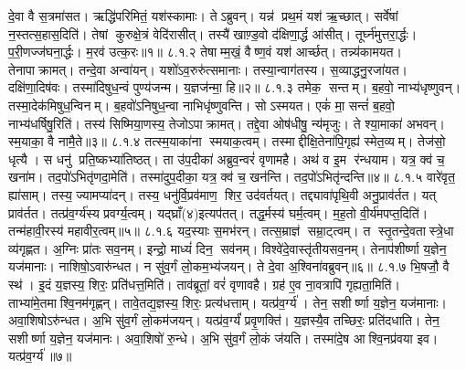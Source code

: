 दे॒वा वै स॒त्रमा॑सत। ऋद्धि॑परिमितं॒ यश॑स्कामाः। तेऽब्रुवन्। यन्न॑ प्रथ॒मं यश॑ ऋ॒च्छात्। सर्वे॑षां न॒स्तत्स॒हास॒दिति॑। तेषां कुरुक्षे॒त्रं वेदि॑रासीत्। तस्यै॑ खाण़्ड॒वो द॑क्षिणा॒र्द्ध आ॑सीत्। तूर्घ्न॑मुत्तरा॒र्द्धः। प॒री॒णज्ज॑घना॒र्द्धः। म॒रव॑ उत्क॒रः॥१॥
८.१.२
तेषाम्म॒खं॒ वैष्ण॒वं यश॑ आर्च्छत्। तन्न्य॑कामयत। तेनापाक्रामत्। तन्दे॒वा अन्वा॑यन्। यशो॑ऽव॒रुरु॑त्समानाः। तस्या॒न्वाग॑तस्य। स॒व्याद्धनु॒रजा॑यत। दक्षि॑णा॒दिष॑वः। तस्मा॑दिषुध॒न्वं पुण्य॑जन्म। य॒ज्ञज॑न्मा॒ हि॥२॥
८.१.३
तमेक॒ सन्तम्। ब॒हवो॒ नाभ्य॑धृष्णुवन्। तस्मा॒देक॑मिषुध॒न्विनम्। ब॒हवो॑ऽनिषुध॒न्वा नाभिधृ॑ष्णुवन्ति। सोऽस्मयत। एकं॑ मा॒ सन्तं॑ ब॒हवो॒ नाभ्य॑धर्\mbox{}षिषु॒रिति॑। तस्य॑ सिष्मिया॒णस्य॒ तेजोऽपाक्रामत्। तद्दे॒वा ओष॑धीषु॒ न्य॑मृजुः। ते श्या॒माका॑ अभवन्। स्म॒याका॒ वै नामै॒ते॥३॥
८.१.४
तत्स्म॒याका॑ना स्मयाक॒त्वम्। तस्माद्दीक्षि॒तेना॑पि॒गृह्य॑ स्मेत॒व्यम्। तेज॑सो॒ धृत्यै। स धनु॑ प्रति॒ष्कभ्या॑तिष्ठत्। ता उ॑प॒दीका॑ अब्रुव॒न्वरं॑ वृणामहै। अथ॑ व इ॒म र॑न्धयाम। यत्र॒ क्व॑ च॒ खना॑म। तद॒पो॑ऽभितृ॑णदा॒मेति॑। तस्मा॑दुप॒दीका॒ यत्र॒ क्व॑ च॒ खन॑न्ति। तद॒पो॑ऽभितृ॑न्दन्ति॥४॥
८.१.५
वारे॑वृत॒ ह्या॑साम्। तस्य॒ ज्यामप्या॑दन्। तस्य॒ धनु॑र्वि॒प्रव॑माण॒ शिर॒ उद॑वर्तयत्। तद्द्यावा॑पृथि॒वी अनु॒प्राव॑र्तत। यत् प्राव॑र्तत। तत्प्र॑व॒र्ग्य॑स्य प्रवर्ग्य॒त्वम्। यद्घ्राँ(४)इत्यप॑तत्। तद्ध॒र्मस्य॑ घर्म॒त्वम्। म॒ह॒तो वी॒र्य॑मपप्त॒दिति॑। तन्म॑हावी॒रस्य॑ महावीर॒त्वम्॥५॥
८.१.६
यद॒स्याः स॒मभ॑रन्। तत्स॒म्राज्ञ॑ सम्रा॒ट्त्वम्। त स्तृ॒तन्दे॒वतास्त्रे॒धा व्य॑गृह्णत। अ॒ग्निः प्रा॑तः सव॒नम्। इन्द्रो॒ माध्यं॑ दिन॒ सव॑नम्। विश्वे॑दे॒वास्तृ॑तीयसव॒नम्। तेनाप॑शीर्ष्णा य॒ज्ञेन॒ यज॑मानाः। नाशिषो॒ऽवारु॑न्धत। न सु॑व॒र्गं लो॒कम॒भ्य॑जयन्। ते दे॒वा अ॒श्विना॑वब्रुवन्॥६॥
८.१.७
भि॒षजौ॒ वै स्थ॑। इ॒दं य॒ज्ञस्य॒ शिरः॒ प्रति॑धत्त॒मिति॑। ताव॑ब्रूतां॒ वरं॑ वृणावहै। ग्रह॑ ए॒व ना॒वत्रापि॑ गृह्यता॒मिति॑। ताभ्या॑मे॒तमाश्वि॒नम॑गृह्णन्। तावे॒तद्य॒ज्ञस्य॒ शिरः॒ प्रत्य॑धत्ताम्। यत्प्र॑व॒र्ग्य॑। तेन॒ सशीर्ष्णा य॒ज्ञेन॒ यज॑मानाः। अवा॒शिषोऽरु॑न्धत। अ॒भि सु॑व॒र्गं लो॒कम॑जयन्। यत्प्र॑व॒र्ग्यं॑ प्रवृ॒णक्ति॑। य॒ज्ञस्यै॒व तच्छिरः॒ प्रति॑दधाति। तेन॒ सशीर्ष्णा य॒ज्ञेन॒ यज॑मानः। अवा॒शिषो॑ रु॒न्धे। अ॒भि सु॑व॒र्गं लो॒कं ज॑यति। तस्मा॑दे॒ष आश्वि॒नप्र॑वया इव। यत्प्र॑व॒र्ग्य॑॥७॥
\anuvakamend


